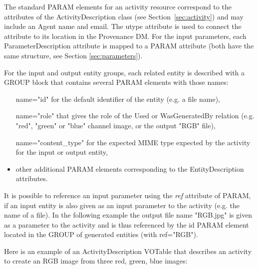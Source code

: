 The standard PARAM elements for an activity resource correspond to the attributes of the ActivityDescription class (see Section~\ref{sec:activity}) and may include an Agent name and email. The utype attribute is used to connect the attribute to its location in the Provenance DM.
For the input parameters, each ParameterDescription attribute is mapped to a PARAM attribute (both have the same structure, see Section \ref{sec:parameters}).

For the input and output entity groups, each related entity is described with a GROUP block that contains several PARAM elements with those names:
\begin{itemize}
 \item[name="id"] for the default identifier of the entity (e.g. a file name),
 \item[name="role"] that gives the role of the Used or WasGeneratedBy relation (e.g. "red", "green" or "blue" channel image, or the output "RGB" file),
 \item[name="content\_type"] for the expected MIME type expected by the activity for the input or output entity,
 \item other additional PARAM elements corresponding to the EntityDescription attributes.
 \end{itemize} 

It is possible to reference an input parameter using the \emph{ref} attribute of PARAM, if an input entity is also given as an input parameter to the activity (e.g. the name of a file). In the following example the output file name "RGB.jpg" is given as a parameter to the activity and is thus referenced by the id PARAM element located in the GROUP of generated entities (with ref="RGB").

Here is an example of an ActivityDescription VOTable that describes an activity to create an RGB image from three red, green, blue images:


